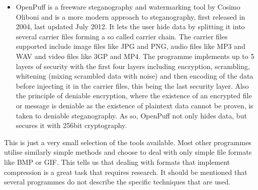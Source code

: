 \begin{itemize}
	\item OpenPuff is a freeware steganography and watermarking tool by Cosimo Oliboni and is a more modern approach to steganography, first released in 2004, last updated July 2012. 
	It lets the user hide data by splitting it into several carrier files forming a so called carrier chain. The carrier files supported include image files like JPG and PNG, audio files like MP3 and WAV and video files like 3GP and MP4.
	The programme implements up to 5 layers of security with the first four layers including encryption, scrambling, whitening (mixing scrambled data with noise) and then encoding of the data before injecting it in the carrier files, this being the last security layer\citep{Oliboni2012}. 
	Also the principle of deniable encryption, where the existence of an encrypted file or message is deniable as the existence of plaintext data cannot be proven\citep{Schneier2008}, is taken to deniable steganography. As so, OpenPuff not only hides data, but secures it with 256bit cryptography.
\end{itemize}

This is just a very small selection of the tools available. 
Most other programmes utilise similarly simple methods and choose to deal with only simple file formats like BMP or GIF. 
This tells us that dealing with formats that implement compression is a great task that requires research. 
It should be mentioned that several programmes do not describe the specific techniques that are used.